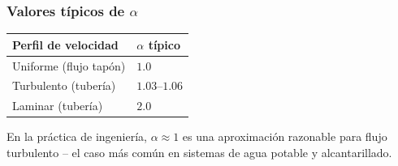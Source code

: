\documentclass{ltx-talk}
\begin{document}
\begin{frame}
  \frametitle{Valores típicos de $\alpha$}
  \begin{center}
  \begin{tabular}{ll}
    \toprule
    \textbf{Perfil de velocidad} & \textbf{$\alpha$ típico} \\
    \midrule
    Uniforme (flujo tapón) & $1.0$ \\
    Turbulento (tubería) & $1.03$--$1.06$ \\
    Laminar (tubería) & $2.0$ \\
    \bottomrule
  \end{tabular}
  \end{center}
  \vspace{0.5em}
  En la práctica de ingeniería, $\alpha \approx 1$ es una aproximación
  razonable para flujo turbulento -- el caso más común en sistemas de
  agua potable y alcantarillado.
\end{frame}
\end{document}
